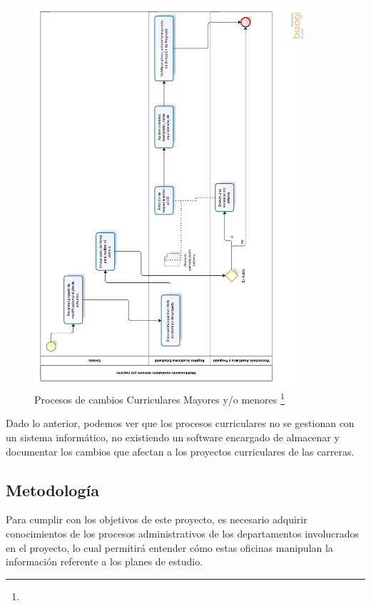 		\begin{figure}[H]
			\centering
			\includegraphics[width=0.9\textwidth]{images/Capitulo_1/Procesos_cambios_curriculares.png}
			\caption[Procesos de cambios Curriculares Mayores y/o menores ]{Procesos de cambios Curriculares Mayores y/o menores  \footnote{}}
			\label{Figura2}
		\end{figure}
		
		\newpage
		
		
		Dado lo anterior, podemos ver que los procesos curriculares no se gestionan con un sistema informático, no existiendo un software encargado  de almacenar y documentar los cambios que afectan a los proyectos curriculares de las carreras.
		
	
\subsection{Metodología}

Para cumplir con los objetivos de este proyecto, es necesario adquirir conocimientos de los procesos administrativos de los departamentos involucrados en el proyecto, lo cual permitirá entender cómo estas oficinas manipulan la información referente a los planes de estudio.
\\

